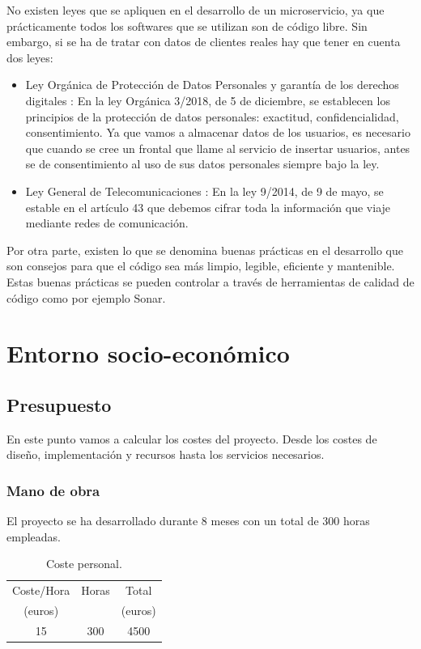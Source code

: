 \documentclass[12pt]{report} %
\begin{document}
No existen leyes que se apliquen en el desarrollo de un microservicio, ya que prácticamente todos los softwares que se utilizan son de código libre. Sin embargo, si se ha de tratar con datos de clientes reales hay que tener en cuenta dos leyes:
\begin{itemize}
	\item Ley Orgánica de Protección de Datos Personales y garantía de los derechos digitales \cite{LeyProteccion}: En la ley Orgánica 3/2018, de 5 de diciembre, se establecen los principios de la protección de datos personales: exactitud, confidencialidad, consentimiento. Ya que vamos a almacenar datos de los usuarios, es necesario que cuando se cree un frontal que llame al servicio de insertar usuarios, antes se de consentimiento al uso de sus datos personales siempre bajo la ley.
	\item Ley General de Telecomunicaciones \cite{LeyComunicaciones}: En la ley 9/2014, de 9 de mayo, se estable en el artículo 43 que debemos cifrar toda la información que viaje mediante redes de comunicación. 
\end{itemize}

Por otra parte, existen lo que se denomina buenas prácticas en el desarrollo que son consejos para que el código sea más limpio, legible, eficiente y mantenible. Estas buenas prácticas se pueden controlar a través de herramientas de calidad de código como por ejemplo Sonar.

\chapter{Entorno socio-económico}	

\section{Presupuesto}
En este punto vamos a calcular los costes del proyecto. Desde los costes de diseño, implementación y recursos hasta los servicios necesarios.

\subsection{Mano de obra}

El proyecto se ha desarrollado durante 8 meses con un total de 300 horas empleadas.

\begin{table}[H]
	\begin{center}
		\begin{tabular}{|c|c|c|}
			\hline
			Coste/Hora & Horas & Total \\
			(euros) &  & (euros) \\
			\hline \hline
			15 & 300 & 4500 \\ \hline
			
		\end{tabular}
		\caption{Coste personal.}		
		\label{costePersonal}
	\end{center}
\end{table}
\end{document}
